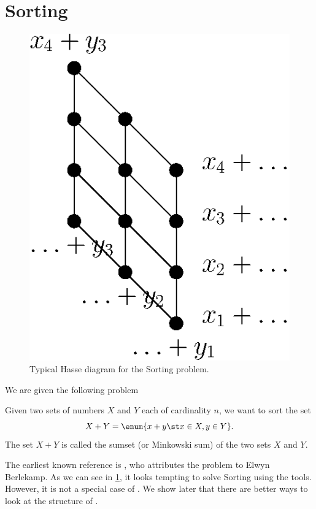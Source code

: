 \section{Sorting \XY}
\label{tree:related:xy}

\begin{figure}
	\centering
	\includegraphics[height=0.2\textheight]{fig/related/x+y}
	\caption{Typical Hasse diagram for the Sorting \XY problem.}
	\label{fig:related:xy}
\end{figure}

We are given the following problem
\begin{problem}[Sorting \XY]
Given two sets of numbers \(X\) and \(Y\) each of cardinality \(n\), we want to
sort the set
\begin{displaymath}
X + Y = \enum{x + y \st x \in X, y \in Y}.
\end{displaymath}
The set \(X + Y\) is called the sumset (or Minkowski sum) of the two sets \(X\) and
\(Y\).
\end{problem}

The earliest known reference is \citet*{fredman:1976}, who attributes
the problem to Elwyn Berlekamp. As we can see in \ref{fig:related:xy}, it
looks tempting to solve Sorting \XY using the \concept{\SUPI} tools.
However, it is not a special case of \SUPI. We show later that
there are better ways to look at the structure of \XY.

